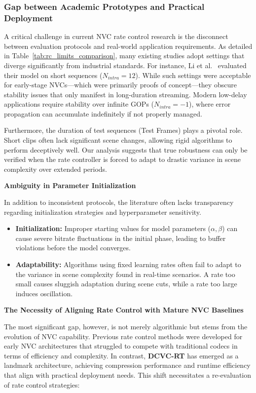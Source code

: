\subsubsection*{Gap between Academic Prototypes and Practical Deployment}

A critical challenge in current NVC rate control research is the disconnect between evaluation protocols and real-world application requirements. As detailed in Table~\ref{tab:rc_limits_comparison}, many existing studies adopt settings that diverge significantly from industrial standards. For instance, Li et al.~\cite{51} evaluated their model on short sequences ($N_{intra}=12$). While such settings were acceptable for early-stage NVCs—which were primarily proofs of concept—they obscure stability issues that only manifest in long-duration streaming. Modern low-delay applications require stability over infinite GOPs ($N_{intra} = -1$), where error propagation can accumulate indefinitely if not properly managed.

Furthermore, the duration of test sequences (Test Frames) plays a pivotal role. Short clips often lack significant scene changes, allowing rigid algorithms to perform deceptively well. Our analysis suggests that true robustness can only be verified when the rate controller is forced to adapt to drastic variance in scene complexity over extended periods.

\noindent \textbf{Ambiguity in Parameter Initialization}

In addition to inconsistent protocols, the literature often lacks transparency regarding initialization strategies and hyperparameter sensitivity.
\begin{itemize}
    \item \textbf{Initialization:} Improper starting values for model parameters ($\alpha, \beta$) can cause severe bitrate fluctuations in the initial phase, leading to buffer violations before the model converges.
    \item \textbf{Adaptability:} Algorithms using fixed learning rates often fail to adapt to the variance in scene complexity found in real-time scenarios. A rate too small causes sluggish adaptation during scene cuts, while a rate too large induces oscillation.
\end{itemize}

\noindent \textbf{The Necessity of Aligning Rate Control with Mature NVC Baselines}

The most significant gap, however, is not merely algorithmic but stems from the evolution of NVC capability. Previous rate control methods were developed for early NVC architectures that struggled to compete with traditional codecs in terms of efficiency and complexity. In contrast, \textbf{DCVC-RT} has emerged as a landmark architecture, achieving compression performance and runtime efficiency that align with practical deployment needs. This shift necessitates a re-evaluation of rate control strategies:

